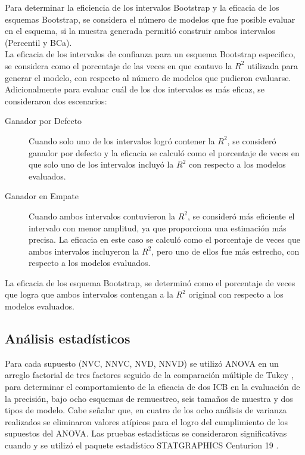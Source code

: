 Para determinar la eficiencia de los intervalos Bootstrap y la eficacia de los esquemas Bootstrap, se considera el número de modelos que fue posible evaluar en el esquema, si la muestra generada permitió construir ambos intervalos (Percentil y BCa).\\


La eficacia de los intervalos de confianza para un esquema Bootstrap especifico, se considera como el porcentaje de las veces en que contuvo la $R^{2}$ utilizada para generar el modelo, con respecto al número de modelos que pudieron evaluarse. Adicionalmente para evaluar cuál de los dos intervalos es más eficaz, se consideraron dos escenarios: 

\begin{description}

	\item[Ganador por Defecto] Cuando solo uno de los intervalos logró contener la \( R^2 \), se consideró ganador por defecto y la eficacia se calculó como el porcentaje de veces en que solo uno de los intervalos incluyó la \( R^2 \)
	con respecto a los modelos evaluados.
	
	
	\item[Ganador en Empate] Cuando ambos intervalos contuvieron la \( R^2 \), se consideró más eficiente el intervalo con menor amplitud, ya que proporciona una estimación más precisa. La eficacia en este caso se calculó como el porcentaje de veces que ambos intervalos incluyeron la \( R^2 \), pero uno de ellos fue más estrecho, con respecto a los modelos evaluados.
	
\end{description}

 
La eficacia de los esquema Bootstrap, se determinó como el porcentaje de veces que logra que ambos intervalos contengan a la \( R^2 \) original con respecto a los modelos evaluados.\\


	 	
	 	
\subsection{Análisis estadísticos}
Para cada supuesto (NVC, NNVC, NVD, NNVD) se utilizó ANOVA en un arreglo factorial de tres factores seguido de la comparación múltiple de Tukey \parencite{montgomery-2017}, para determinar el comportamiento de la eficacia de dos ICB en la evaluación de la precisión, bajo ocho esquemas de remuestreo, seis tamaños de muestra y dos tipos de modelo. Cabe señalar que, en cuatro de los ocho análisis de varianza realizados se eliminaron valores atípicos para el logro del cumplimiento de los supuestos del ANOVA.
Las pruebas estadísticas se consideraron significativas cuando  y se utilizó el paquete estadístico STATGRAPHICS Centurion 19 \parencite{statgraphics-2024} .




